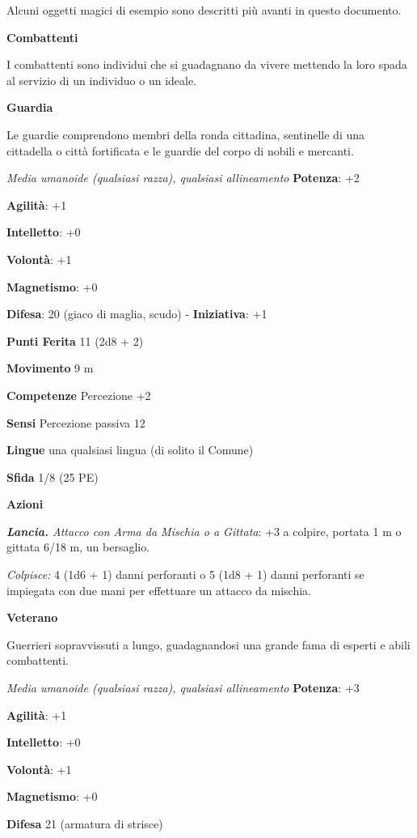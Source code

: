 \begin{multicols}{2}
Alcuni oggetti magici di esempio sono descritti più avanti in questo
documento.

\textbf{Combattenti}

I combattenti sono individui che si guadagnano da vivere mettendo la
loro spada al servizio di un individuo o un ideale.

\textbf{Guardia}

Le guardie comprendono membri della ronda cittadina, sentinelle di una
cittadella o città fortificata e le guardie del corpo di nobili e
mercanti.

\emph{Media umanoide (qualsiasi razza), qualsiasi allineamento}
\textbf{Potenza}: +2

\textbf{Agilità}: +1

\textbf{Intelletto}: +0

\textbf{Volontà}: +1

\textbf{Magnetismo}: +0

\textbf{Difesa}: 20 (giaco di maglia, scudo) - \textbf{Iniziativa}: +1

\textbf{Punti Ferita} 11 (2d8 + 2)

\textbf{Movimento} 9 m

\textbf{Competenze} Percezione +2

\textbf{Sensi} Percezione passiva 12

\textbf{Lingue} una qualsiasi lingua (di solito il Comune)

\textbf{Sfida} 1/8 (25 PE)\smallskip

\smallskip\textbf{Azioni}

\emph{\textbf{Lancia.} Attacco con Arma da Mischia o a Gittata}: +3 a
colpire, portata 1 m o gittata 6/18 m, un bersaglio.

\emph{Colpisce:} 4 (1d6 + 1) danni perforanti o 5 (1d8 + 1) danni
perforanti se impiegata con due mani per effettuare un attacco da
mischia.

\textbf{Veterano}

Guerrieri sopravvissuti a lungo, guadagnandosi una grande fama di
esperti e abili combattenti.

\emph{Media umanoide (qualsiasi razza), qualsiasi allineamento}
\textbf{Potenza}: +3

\textbf{Agilità}: +1

\textbf{Intelletto}: +0

\textbf{Volontà}: +1

\textbf{Magnetismo}: +0

\textbf{Difesa} 21 (armatura di strisce)


\end{multicols}
